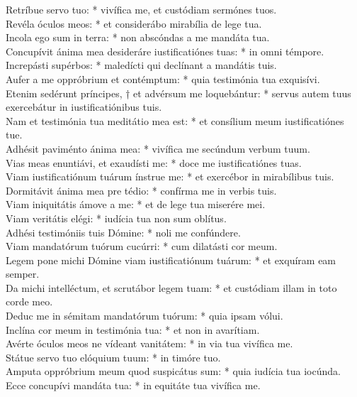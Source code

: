 {	Retríbue servo tuo: * vivífica me, et custódiam sermónes tuos. \\
	Revéla óculos meos: * et considerábo mirabília de lege tua. \\
	Incola ego sum in terra: * non abscóndas a me mandáta tua. \\
	Concupívit ánima mea desideráre iustificatiónes tuas: * in omni témpore. \\
	Increpásti supérbos: * maledícti qui declínant a mandátis tuis. \\
	Aufer a me oppróbrium et contémptum: * quia testimónia tua exquisívi. \\
	Etenim sedérunt príncipes, † et advérsum me loquebántur: * servus autem tuus exercebátur in iustificatiónibus tuis. \\
	Nam et testimónia tua meditátio mea est: * et consílium meum iustificatiónes tue. \\
	Adhésit paviménto ánima mea: * vivífica me secúndum verbum tuum. \\
	Vias meas enuntiávi, et exaudísti me: * doce me iustificatiónes tuas. \\
	Viam iustificatiónum tuárum ínstrue me: * et exercébor in mirabílibus tuis. \\
	Dormitávit ánima mea pre tédio: * confírma me in verbis tuis. \\
	Viam iniquitátis ámove a me: * et de lege tua miserére mei. \\
	Viam veritátis elégi: * iudícia tua non sum oblítus. \\
	Adhési testimóniis tuis Dómine: * noli me confúndere. \\
	Viam mandatórum tuórum cucúrri: * cum dilatásti cor meum. \\
	Legem pone michi Dómine viam iustificatiónum tuárum: * et exquíram eam semper. \\
	Da michi intelléctum, et scrutábor legem tuam: * et custódiam illam in toto corde meo. \\
	Deduc me in sémitam mandatórum tuórum: * quia ipsam vólui. \\
	Inclína cor meum in testimónia tua: * et non in avarítiam. \\
	Avérte óculos meos ne vídeant vanitátem: * in via tua vivífica me. \\
	Státue servo tuo elóquium tuum: * in timóre tuo. \\
	Amputa oppróbrium meum quod suspicátus sum: * quia iudícia tua iocúnda. \\
	Ecce concupívi mandáta tua: * in equitáte tua vivífica me. \\
}
